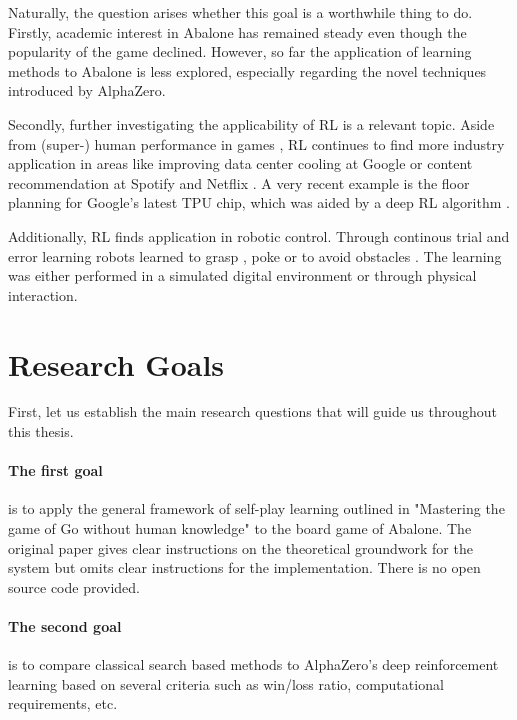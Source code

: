 Naturally, the question arises whether this goal is a worthwhile thing to do. Firstly, academic interest in Abalone has remained steady even though the popularity of the game declined. However, so far the application of learning methods to Abalone is less explored, especially regarding the novel techniques introduced by AlphaZero.

Secondly, further investigating the applicability of RL is a relevant topic. Aside from (super-) human performance in games \cite{mnih_human-level_2015, berner_dota_2019,vinyals_grandmaster_2019}, RL continues to find more industry application in areas like improving data center cooling at Google \cite{gamble_safety-first_2018} or content recommendation at Spotify \cite{jebara_for_2020} and Netflix \cite{siddiqi_ml_2019}. A very recent example is the floor planning for Google's latest TPU chip, which was aided by a deep RL algorithm \cite{mirhoseini_graph_2021}.

Additionally, RL finds application in robotic control. Through continous trial and error learning robots learned to grasp \cite{pinto_supersizing_2016,zeng_learning_2018}, poke \cite{agrawal_learning_nodate} or to avoid obstacles \cite{kahn_uncertainty-aware_2017}. The learning was either performed in a simulated digital environment or through physical interaction.
\section{Research Goals}
First, let us establish the main research questions that will guide us throughout this thesis.

\paragraph{The first goal} is to apply the general framework of self-play learning outlined in "Mastering the game of Go without human knowledge" to the board game of Abalone. \cite{silver_mastering_2017} The original paper gives clear instructions on the theoretical groundwork for the system but omits clear instructions for the implementation. There is no open source code provided.

\paragraph{The second goal} is to compare classical search based methods to AlphaZero's deep reinforcement learning based on several criteria such as win/loss ratio, computational requirements, etc.

